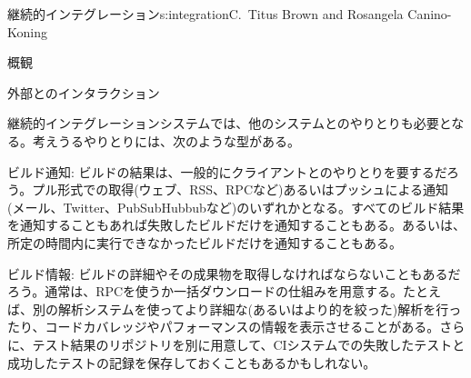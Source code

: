 \begin{aosachapter}{継続的インテグレーション}{s:integration}{C.\ Titus Brown and Rosangela Canino-Koning}
\begin{aosasect1}{概観}
\begin{aosasect2}{外部とのインタラクション}

継続的インテグレーションシステムでは、他のシステムとのやりとりも必要となる。考えうるやりとりには、次のような型がある。

\begin{aosadescription}

  \item{ビルド通知}: ビルドの結果は、一般的にクライアントとのやりとりを要するだろう。プル形式での取得(ウェブ、RSS、RPCなど)あるいはプッシュによる通知(メール、Twitter、PubSubHubbubなど)のいずれかとなる。すべてのビルド結果を通知することもあれば失敗したビルドだけを通知することもある。あるいは、所定の時間内に実行できなかったビルドだけを通知することもある。

  \item{ビルド情報}: ビルドの詳細やその成果物を取得しなければならないこともあるだろう。通常は、RPCを使うか一括ダウンロードの仕組みを用意する。たとえば、別の解析システムを使ってより詳細な(あるいはより的を絞った)解析を行ったり、コードカバレッジやパフォーマンスの情報を表示させることがある。さらに、テスト結果のリポジトリを別に用意して、CIシステムでの失敗したテストと成功したテストの記録を保存しておくこともあるかもしれない。


\end{aosadescription}
\end{aosasect2}
\end{aosasect1}
\end{aosachapter}
